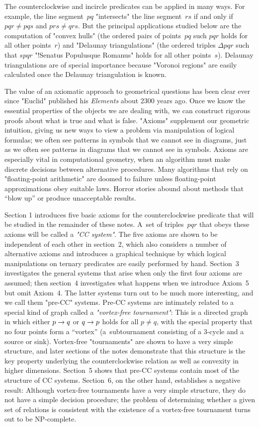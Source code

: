 The counterclockwise and incircle
 predicates can be applied in many ways. For example, the line
segment~$pq$ "intersects" the line segment~$rs$ if and only if $pqr \neq
pqs$ and $prs\neq qrs$. But the principal applications studied below
are the computation of "convex hulls" (the ordered pairs of
points~$pq$ such $pqr$ holds for all other points~$r$) and "Delaunay
triangulations" (the ordered triples $\Delta pqr$ such that $spqr$
"!Senatus Populusque Romanus"
holds for all other points~$s$). Delaunay triangulations are of special
importance because "Voronoi regions" are easily calculated once the
Delaunay triangulation is known.

The value of an axiomatic approach to geometrical questions has been clear
ever since "Euclid" published his {\sl Elements\/} about 2300 years ago.
Once we know the essential properties of the objects we are dealing with,
we can construct rigorous proofs about what is true and what is false.
"Axioms" supplement our geometric intuition, giving us new ways to view
a problem via manipulation of logical formulas; we often see patterns
in symbols that we cannot see in diagrams, just as we often see patterns
in diagrams that we cannot see in symbols.
Axioms are especially vital in computational geometry, when an algorithm
must make discrete decisions between alternative procedures. Many algorithms
that rely on "floating-point arithmetic" are doomed to failure unless
floating-point approximations obey suitable laws. Horror stories abound
about methods that ``blow up'' or produce unacceptable results.

Section 1 introduces five basic axioms for the counterclockwise
predicate that will be studied in the remainder of these notes. A~set
of triples~$pqr$ that obeys these axioms will be  called a {\it "CC system"}.
The five axioms are shown to be independent of each other in section~2, which
also considers a number of alternative axioms and introduces a graphical
technique by which logical manipulations on ternary predicates are
easily performed by hand. Section~3 investigates the general systems that
arise when only the first four axioms are assumed; then section~4
investigates what happens when we introduce Axiom~5 but omit Axiom~4.
The latter systems turn out to be much more interesting, and we call
them "pre-CC" systems. Pre-CC systems are intimately related to a
special kind of graph called a {\it"vortex-free tournament"\/}:
This is a directed graph in which either $p\rightarrow q$ or $q\rightarrow p$ holds for all
$p\neq q$, with the special property that no four points form a ``vortex''
(a~subtournament consisting of a 3-cycle and a source or sink).
Vortex-free "tournaments" are shown to have a very simple structure, and
later sections of the notes demonstrate that this structure is the
key property underlying the counterclockwise relation as well as convexity
in higher dimensions. Section~5 shows that pre-CC systems contain most
of the structure of CC systems. Section~6, on the other hand,
establishes a negative result: Although vortex-free tournaments have a
very simple structure, they do not have a simple decision procedure;
the problem of determining whether a given set of relations is
consistent with the existence of a vortex-free tournament turns out to
be NP-complete.

